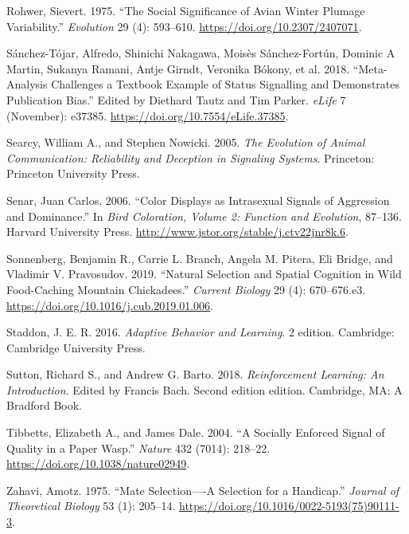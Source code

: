 \documentclass[
  12pt,
]{article}
\newlength{\cslhangindent}
\newlength{\cslentryspacingunit} %
\newenvironment{CSLReferences}[2] %
 {%
  \setlength{\parindent}{0pt}
  \ifodd #1
  \let\oldpar\par
  \def\par{\hangindent=\cslhangindent\oldpar}
  \fi
  \setlength{\parskip}{#2\cslentryspacingunit}
 }%
 {}
\begin{document}
\begin{CSLReferences}{1}{0}
\leavevmode{}%
Rohwer, Sievert. 1975. {``The {Social} {Significance} of {Avian}
{Winter} {Plumage} {Variability}.''} \emph{Evolution} 29 (4): 593--610.
\url{https://doi.org/10.2307/2407071}.

\leavevmode{}%
Sánchez-Tójar, Alfredo, Shinichi Nakagawa, Moisès Sánchez-Fortún,
Dominic A Martin, Sukanya Ramani, Antje Girndt, Veronika Bókony, et al.
2018. {``Meta-Analysis Challenges a Textbook Example of Status
Signalling and Demonstrates Publication Bias.''} Edited by Diethard
Tautz and Tim Parker. \emph{eLife} 7 (November): e37385.
\url{https://doi.org/10.7554/eLife.37385}.

\leavevmode{}%
Searcy, William A., and Stephen Nowicki. 2005. \emph{The {Evolution} of
{Animal} {Communication}: {Reliability} and {Deception} in {Signaling}
{Systems}}. Princeton: Princeton University Press.

\leavevmode{}%
Senar, Juan Carlos. 2006. {``Color Displays as Intrasexual Signals of
Aggression and Dominance.''} In \emph{Bird Coloration, Volume 2:
{Function} and Evolution}, 87--136. Harvard University Press.
\url{http://www.jstor.org/stable/j.ctv22jnr8k.6}.

\leavevmode{}%
Sonnenberg, Benjamin R., Carrie L. Branch, Angela M. Pitera, Eli Bridge,
and Vladimir V. Pravosudov. 2019. {``Natural {Selection} and {Spatial}
{Cognition} in {Wild} {Food}-{Caching} {Mountain} {Chickadees}.''}
\emph{Current Biology} 29 (4): 670--676.e3.
\url{https://doi.org/10.1016/j.cub.2019.01.006}.

\leavevmode{}%
Staddon, J. E. R. 2016. \emph{Adaptive {Behavior} and {Learning}}. 2
edition. Cambridge: Cambridge University Press.

\leavevmode{}%
Sutton, Richard S., and Andrew G. Barto. 2018. \emph{Reinforcement
{Learning}: {An} {Introduction}}. Edited by Francis Bach. Second edition
edition. Cambridge, MA: A Bradford Book.

\leavevmode{}%
Tibbetts, Elizabeth A., and James Dale. 2004. {``A Socially Enforced
Signal of Quality in a Paper Wasp.''} \emph{Nature} 432 (7014): 218--22.
\url{https://doi.org/10.1038/nature02949}.

\leavevmode{}%
Zahavi, Amotz. 1975. {``Mate Selection----{A} Selection for a
Handicap.''} \emph{Journal of Theoretical Biology} 53 (1): 205--14.
\url{https://doi.org/10.1016/0022-5193(75)90111-3}.

\end{CSLReferences}
\end{document}
